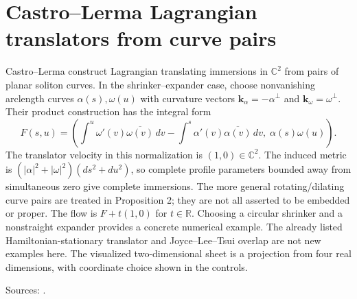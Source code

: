 \chapter{Castro--Lerma Lagrangian translators from curve pairs}\label{sec:catalogue-castro-lerma-pairs}
\begin{example}\label{ex:catalogue-castro-lerma-pairs}
Castro--Lerma construct Lagrangian translating immersions in $\mathbb C^2$ from pairs of planar soliton curves. In the shrinker--expander case, choose nonvanishing arclength curves $\alpha(s),\omega(u)$ with curvature vectors $\mathbf k_\alpha=-\alpha^\perp$ and $\mathbf k_\omega=\omega^\perp$. Their product construction has the integral form
\[
 F(s,u)=\left(\int^u\omega'(v)\overline{\omega(v)}\,dv-
                  \int^s\alpha'(v)\overline{\alpha(v)}\,dv,\;\alpha(s)\omega(u)\right).
\]
The translator velocity in this normalization is $(1,0)\in\mathbb C^2$. The induced metric is $(|\alpha|^2+|\omega|^2)(ds^2+du^2)$, so complete profile parameters bounded away from simultaneous zero give complete immersions. The more general rotating/dilating curve pairs are treated in Proposition 2; they are not all asserted to be embedded or proper.
The flow is $F+t(1,0)$ for $t\in\mathbb R$. Choosing a circular shrinker and a nonstraight expander provides a concrete numerical example. The already listed Hamiltonian-stationary translator and Joyce--Lee--Tsui overlap are not new examples here. The visualized two-dimensional sheet is a projection from four real dimensions, with coordinate choice shown in the controls.
\par Sources: \cite{CatCastroLerma2012}.
\end{example}

